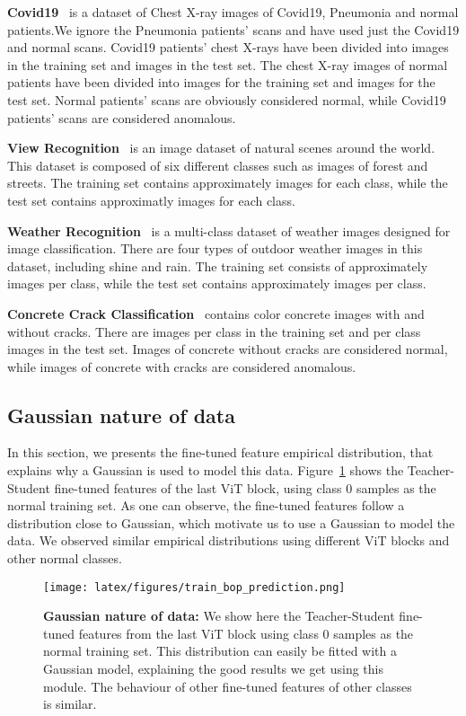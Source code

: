 \documentclass[10pt,twocolumn,letterpaper]{article}
\begin{document}
\textbf{Covid19}~\cite{noauthor_chest_nodate} is a dataset of Chest X-ray images of Covid19, Pneumonia and normal patients.We ignore the Pneumonia patients' scans and have used just the Covid19 and normal scans. Covid19 patients' chest X-rays have been divided into  images in the training set and  images in the test set. The chest X-ray images of normal patients have been divided into  images for the training set and  images for the test set. Normal patients' scans are obviously considered normal, while Covid19 patients' scans are considered anomalous.

\textbf{View Recognition}~\cite{noauthor_intel_nodate} is an image dataset of natural scenes around the world. This dataset is composed of six different classes such as images of forest and streets. The training set contains approximately  images for each class, while the test set contains approximatly  images for each class.

\textbf{Weather Recognition}~\cite{ajayi_multi-class_2018} is a multi-class dataset of weather images designed for image classification. There are four types of outdoor weather images in this dataset, including shine and rain. The training set consists of approximately  images per class, while the test set contains approximately  images per class.

\textbf{Concrete Crack Classification}~\cite{ozgenel_concrete_2019} contains  color concrete images with and without cracks. There are  images per class in the training set and  per class images in the test set. Images of concrete without cracks are considered normal, while images of concrete with cracks are considered anomalous.

\subsection{Gaussian nature of data}
\label{gaussian_nature}
In this section, we presents the fine-tuned feature empirical distribution, that explains why a Gaussian is used to model this data. Figure~\ref{fig:bopPreds} shows the Teacher-Student fine-tuned features of the last ViT block, using class 0 samples as the normal training set. As one can observe, the fine-tuned features follow a distribution close to Gaussian, which motivate us to use a Gaussian to model the data. We observed similar empirical distributions using different ViT blocks and other normal classes.
 
\begin{figure}[h]
\begin{center}
\texttt{[image: latex/figures/train\_bop\_prediction.png]}
\end{center}
  \caption{{\bf Gaussian nature of data:} We show here the Teacher-Student fine-tuned features from the last ViT block using class 0 samples as the normal training set. This distribution can easily be fitted with a Gaussian model, explaining the good results we get using this module. The behaviour of other fine-tuned features of other classes is similar.}
\label{fig:bopPreds}
\end{figure}
\end{document}
